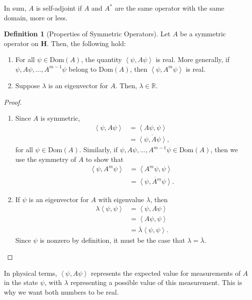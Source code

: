 \documentclass[12pt]{extarticle}
\newcommand{\R}{\mathbb{R}}
\newcommand{\iprod}[2]{\left\langle #1,#2\right\rangle}
\theoremstyle{plain}
\theoremstyle{definition}
\newtheorem*{definition}{Definition}
\theoremstyle{remark}
\renewcommand{\newline}{\hfill\break}
\begin{document}
  In sum, $A$ is self-adjoint if $A$ and $A^{\ast}$ are the same operator with the same domain, more or less.
  \begin{definition}[Properties of Symmetric Operators]
    Let $A$ be a symmetric operator on $\mathbf{H}$. Then, the following hold:
    \begin{enumerate}[(1)]
      \item For all $\psi\in \text{Dom}(A)$, the quantity $\iprod{\psi}{A\psi}$ is real. More generally, if $\psi, A\psi, \dots, A^{m-1}\psi$ belong to $\text{Dom}(A)$, then $\iprod{\psi}{A^{m}\psi}$ is real.
      \item Suppose $\lambda$ is an eigenvector for $A$. Then, $\lambda \in \R$.
    \end{enumerate}
  \end{definition}
  \begin{proof}
    \begin{enumerate}[(1)]
      \item Since $A$ is symmetric,
        \begin{align*}
          \iprod{\psi}{A\psi} &= \iprod{A\psi}{\psi}\\
                              &= \overline{\iprod{\psi}{A\psi}},
        \end{align*}
        for all $\psi \in \text{Dom}(A)$. Similarly, if $\psi,A\psi,\dots,A^{m-1}\psi\in \text{Dom}(A)$, then we use the symmetry of $A$ to show that
        \begin{align*}
          \iprod{\psi}{A^{m}\psi} &= \iprod{A^{m}\psi}{\psi}\\
                                  &= \overline{\iprod{\psi}{A^{m}\psi}}.
        \end{align*}
      \item If $\psi$ is an eigenvector for $A$ with eigenvalue $\lambda$, then
        \begin{align*}
          \lambda \iprod{\psi}{\psi} &= \iprod{\psi}{A\psi}\\
                                     &= \iprod{A\psi}{\psi}\\
                                     &= \overline{\lambda}\iprod{\psi}{\psi}.
        \end{align*}
        Since $\psi$ is nonzero by definition, it must be the case that $\lambda = \overline{\lambda}$.
    \end{enumerate}
  \end{proof}
  In physical terms, $\iprod{\psi}{A\psi}$ represents the expected value for measurements of $A$ in the state $\psi$, with $\lambda$ representing a possible value of this measurement. This is why we want both numbers to be real.\newline
\end{document}
